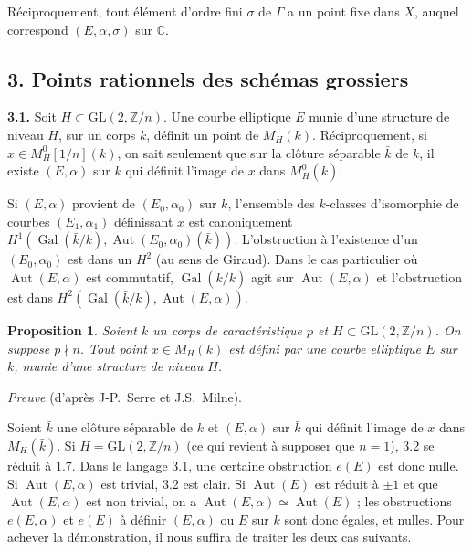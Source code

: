 \documentclass[10pt,a4paper]{amsart}
\theoremstyle{plain}
\newtheorem{proposition}[theorem]{Proposition}
\theoremstyle{definition}
\DeclareMathOperator{\Aut}{Aut}
\newcommand{\ZZ}{\mathbb{Z}}
\newcommand{\CC}{\mathbb{C}}
\newcommand{\GL}{\mathrm{GL}}
\DeclareMathOperator{\Gal}{Gal}
\begin{document}
R\'eciproquement, tout \'el\'ement d'ordre fini $\sigma$ de $\Gamma$ a un point fixe dans $X$, auquel correspond $(E,\alpha,\sigma)$ sur $\CC$.


\subsection*{3. Points rationnels des sch\'emas grossiers}

\setcounter{theorem}{0}
\setcounter{subsection}{2}
\setcounter{theorem}{0}

\medskip\noindent\textbf{3.1.} Soit $H \subset \GL(2,\ZZ/n)$. Une courbe elliptique $E$ munie d'une structure de niveau $H$, sur un corps $k$, d\'efinit un point de $M_H(k)$. R\'eciproquement, si $x \in M_H^0[1/n](k)$, on sait seulement que sur la cl\^oture s\'eparable $\bar{k}$ de $k$, il existe $(E,\alpha)$ sur $\bar{k}$ qui d\'efinit l'image de $x$ dans $M_H^0(\bar{k})$.

Si $(E,\alpha)$ provient de $(E_0, \alpha_0)$ sur $k$, l'ensemble des $k$-classes d'isomorphie de courbes $(E_1, \alpha_1)$ d\'efinissant $x$ est canoniquement $H^1(\Gal(\bar{k}/k), \Aut(E_0,\alpha_0)(\bar{k}))$. L'obstruction \`a l'existence d'un $(E_0,\alpha_0)$ est dans un $H^2$ (au sens de Giraud). Dans le cas particulier o\`u $\Aut(E,\alpha)$ est commutatif, $\Gal(\bar{k}/k)$ agit sur $\Aut(E,\alpha)$ et l'obstruction est dans $H^2(\Gal(\bar{k}/k), \Aut(E,\alpha))$.

\setcounter{theorem}{1}
\begin{proposition}
Soient $k$ un corps de caract\'eristique $p$ et $H \subset \GL(2,\ZZ/n)$. On suppose $p \nmid n$. Tout point $x \in M_H(k)$ est d\'efini par une courbe elliptique $E$ sur $k$, munie d'une structure de niveau $H$.
\end{proposition}

\noindent\emph{Preuve} (d'apr\`es J-P.\ Serre et J.S.\ Milne).

Soient $\bar{k}$ une cl\^oture s\'eparable de $k$ et $(E,\alpha)$ sur $\bar{k}$ qui d\'efinit l'image de $x$ dans $M_H(\bar{k})$. Si $H = \GL(2,\ZZ/n)$ (ce qui revient \`a supposer que $n = 1$), 3.2 se r\'eduit \`a 1.7. Dans le langage 3.1, une certaine obstruction $e(E)$ est donc nulle. Si $\Aut(E,\alpha)$ est trivial, 3.2 est clair. Si $\Aut(E)$ est r\'eduit \`a $\pm 1$ et que $\Aut(E,\alpha)$ est non trivial, on a $\Aut(E,\alpha) \simeq \Aut(E)$ ; les obstructions $e(E,\alpha)$ et $e(E)$ \`a d\'efinir $(E,\alpha)$ ou $E$ sur $k$ sont donc \'egales, et nulles. Pour achever la d\'emonstration, il nous suffira de traiter les deux cas suivants.
\end{document}
